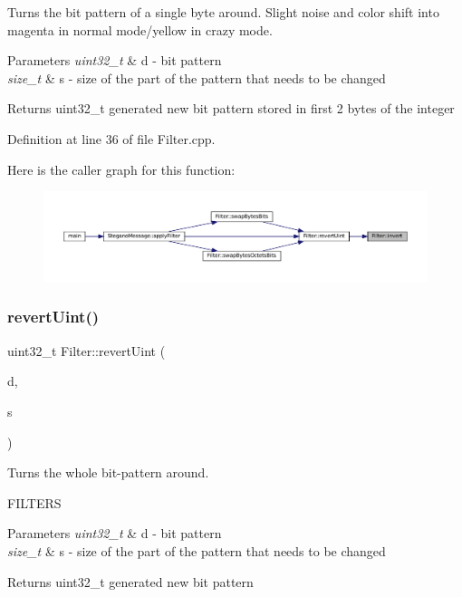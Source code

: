 Turns the bit pattern of a single byte around. Slight noise and color shift into magenta in normal mode/yellow in crazy mode. 


\begin{DoxyParams}{Parameters}
{\em uint32\+\_\+t} & d -\/ bit pattern \\
\hline
{\em size\+\_\+t} & s -\/ size of the part of the pattern that needs to be changed \\
\hline
\end{DoxyParams}
\begin{DoxyReturn}{Returns}
uint32\+\_\+t generated new bit pattern stored in first 2 bytes of the integer 
\end{DoxyReturn}


Definition at line 36 of file Filter.\+cpp.

Here is the caller graph for this function\+:
\nopagebreak
\begin{figure}[H]
\begin{center}
\leavevmode
\includegraphics[width=350pt]{classFilter_a55f792b3f87991db5a5e666827d6214c_icgraph}
\end{center}
\end{figure}
\mbox{\label{classFilter_ae4a4b081886014742d083d9a2b285981}} 
\subsubsection{\texorpdfstring{revertUint()}{revertUint()}}
{\footnotesize\ttfamily uint32\+\_\+t Filter\+::revert\+Uint (\begin{DoxyParamCaption}\item[{uint32\+\_\+t}]{d,  }\item[{size\+\_\+t}]{s }\end{DoxyParamCaption})\hspace{0.3cm}{\ttfamily [static]}}



Turns the whole bit-\/pattern around. 

F\+I\+L\+T\+E\+RS
\begin{DoxyParams}{Parameters}
{\em uint32\+\_\+t} & d -\/ bit pattern \\
\hline
{\em size\+\_\+t} & s -\/ size of the part of the pattern that needs to be changed \\
\hline
\end{DoxyParams}
\begin{DoxyReturn}{Returns}
uint32\+\_\+t generated new bit pattern 
\end{DoxyReturn}


